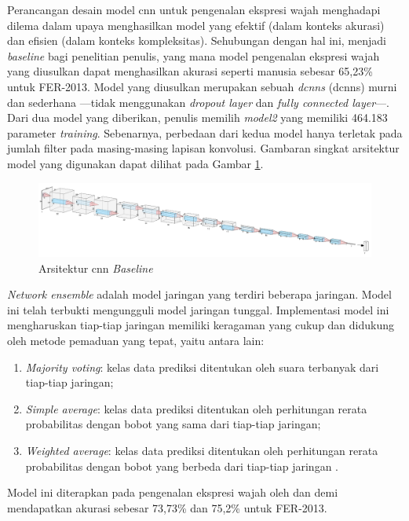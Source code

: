 Perancangan desain model \acrshort{cnn} untuk pengenalan ekspresi wajah menghadapi dilema dalam upaya menghasilkan model yang efektif (dalam konteks akurasi) dan efisien (dalam konteks kompleksitas). Sehubungan dengan hal ini,  menjadi \textit{baseline} bagi penelitian penulis, yang mana model pengenalan ekspresi wajah yang diusulkan dapat menghasilkan akurasi seperti manusia sebesar 65,23\%  untuk FER-2013. Model yang diusulkan merupakan sebuah \textit{\acrlong{dcnns}} (\acrshort{dcnns}) murni dan sederhana ---tidak menggunakan \textit{dropout layer} dan \textit{fully connected layer}---. Dari dua model yang diberikan, penulis memilih \textit{model2} yang memiliki 464.183 parameter \textit{training}. Sebenarnya, perbedaan dari kedua model hanya terletak pada jumlah filter pada masing-masing lapisan konvolusi. Gambaran singkat arsitektur model yang digunakan dapat dilihat pada Gambar \ref{fig:arsiterturcnnbaseline}.
\begin{figure}[t]
    \centering
    \includegraphics[width=14cm]{gambar/arsitektur_baseline_cnn.png}
    \caption[Arsitektur \acrshort{cnn} \textit{Baseline}]{Arsitektur \acrshort{cnn} \textit{Baseline} }
    \label{fig:arsiterturcnnbaseline}
\end{figure}

\textit{Network ensemble} adalah model jaringan yang terdiri beberapa jaringan. Model ini telah terbukti mengungguli model jaringan tunggal. Implementasi model ini mengharuskan tiap-tiap jaringan memiliki keragaman yang cukup dan didukung oleh metode pemaduan yang tepat, yaitu antara lain:
\begin{enumerate}
    \item \textit{Majority voting}: kelas data prediksi ditentukan oleh suara terbanyak dari tiap-tiap jaringan;
    \item \textit{Simple average}: kelas data prediksi ditentukan oleh perhitungan rerata probabilitas dengan bobot yang sama dari tiap-tiap jaringan;
    \item \textit{Weighted average}: kelas data prediksi ditentukan oleh perhitungan rerata probabilitas dengan bobot yang berbeda dari tiap-tiap jaringan .
\end{enumerate}
Model ini diterapkan pada pengenalan ekspresi wajah oleh  dan  demi mendapatkan akurasi sebesar 73,73\% dan 75,2\% untuk FER-2013.

